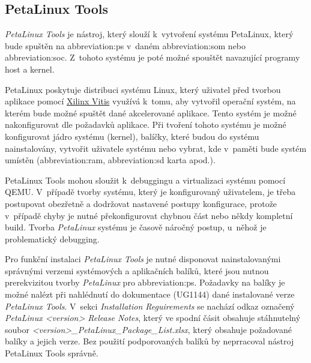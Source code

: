 \documentclass[a4paper, twoside, 11pt]{article}
\begin{document}
		\subsection{PetaLinux Tools}\label{subsec:petalinux-tools}
			\textit{PetaLinux Tools} je nástroj, který slouží k~vytvoření systému PetaLinux, který bude spuštěn na \gls{abbreviation:ps} v~daném \gls{abbreviation:som} nebo \gls{abbreviation:soc}. Z~tohoto systému je poté možné spouštět navazující programy host a kernel.\par
			PetaLinux poskytuje distribuci systému Linux, který uživatel před tvorbou aplikace pomocí \hyperref[subsec:xilinx-vitis]{Xilinx Vitis} využívá k~tomu, aby vytvořil operační systém, na kterém bude možné spuštět dané akcelerované aplikace. Tento systém je možné nakonfigurovat dle požadavků aplikace. Při tvoření tohoto systému je možné konfigurovat jádro systému (kernel), balíčky, které budou do systému nainstalovány, vytvořit uživatele systému nebo vybrat, kde v~paměti bude systém umístěn (\gls{abbreviation:ram}, \gls{abbreviation:sd} karta apod.). \cite{xilinx-petalinux}\par
			PetaLinux Tools mohou sloužit k~debuggingu a virtualizaci systému pomocí QEMU. V~případě tvorby systému, který je konfigurovaný uživatelem, je třeba postupovat obezřetně a dodržovat nastavené postupy konfigurace, protože v~případě chyby je nutné překonfigurovat chybnou část nebo někdy kompletní build. Tvorba \textit{PetaLinux} systému je časově náročný postup, u~něhož je problematický debugging.\par
			Pro funkční instalaci \textit{PetaLinux Tools} je nutné disponovat nainstalovanými správnými verzemi systémových a aplikačních balíků, které jsou nutnou prerekvizitou tvorby \textit{PetaLinux} pro \gls{abbreviation:ps}. Požadavky na balíky je možné nalézt při nahlédnutí do dokumentace \cite{petalinux-tools-documentation-2022} (UG1144) dané instalované verze \textit{PetaLinux Tools}. V~sekci \textit{Installation Reguirements} se nachází odkaz označený \textit{PetaLinux <version> Release Notes}, který ve spodní čásit obsahuje stáhnutelný soubor \textit{<version>\_PetaLinux\_Package\_List.xlsx}, který obsahuje požadované balíky a jejich verze. Bez použití podporovaných balíků by neprracoval nástroj PetaLinux Tools správně.
\end{document}
